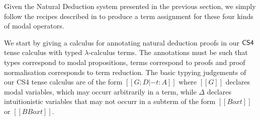 Given the Natural Deduction system presented in the previous section,
we simply follow the recipes described in \cite{barber1997} to produce
a term assignment for these four kinds of modal operators.

We start by giving a calculus for annotating natural deduction proofs
in our $\sf{CS4}$ tense calculus with typed $\lambda$-calculus terms. The
annotations must be such that types correspond to modal propositions,
terms correspond to proofs and proof normalisation corresponds to term
reduction. The basic typying judgements of our CS4 tense calculus are
of the form $[[G ; D |- t : A]]$ where $[[G]]$ declares modal
variables, which may occurr arbitrarily in a term, while $\Delta$
declares intuitionistic variables that may not occurr in a subterm of
the form $[[Box t]]$ or $[[BBox t]]$.


